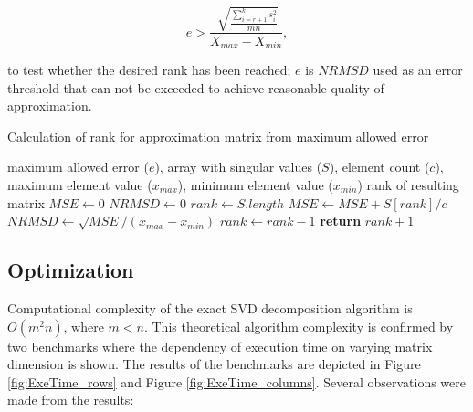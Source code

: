 \begin{equation}
e > \frac{\sqrt[]{\frac{\sum_{i=r+1}^{k} s_{i}^{2}}{m n}}}{X_{max}-X_{min}},
\end{equation}

\noindent
to test whether the desired rank has been reached; $e$ is $\mathit{NRMSD}$ used as an error threshold that can not be exceeded to achieve reasonable quality of approximation.

\begin{algorithm}
  \caption{Calculation of rank for approximation matrix from maximum allowed error}\label{rankAlgorithm}
  \label{alg:rank-calculation}
  \begin{algorithmic}[1]
  	\INPUT maximum allowed error ($e$), array with singular values ($S$), element count ($c$), maximum element value ($x_{max}$), minimum element value ($x_{min}$)
    \OUTPUT rank of resulting matrix
      \State $\mathit{MSE} \gets 0$
      \State $\mathit{NRMSD} \gets 0$
      \State $rank \gets S.length$
        \State $\mathit{MSE} \gets \mathit{MSE} + S[rank]/c$ 
        \State $\mathit{NRMSD} \gets \sqrt{\mathit{MSE}} / (x_{max} - x_{min})$ 
        \State $rank \gets rank - 1$ 
      \EndWhile
      \State \textbf{return} $rank + 1$ 
    \EndProcedure
  \end{algorithmic}
\end{algorithm}

\subsection{Optimization}


Computational complexity of the exact SVD decomposition algorithm is $O(m^2n)$, where $m<n$. This theoretical algorithm complexity is confirmed by two benchmarks where the dependency of execution time on varying matrix dimension is shown. The results of the benchmarks are depicted in Figure \ref{fig:ExeTime_rows} and Figure \ref{fig:ExeTime_columns}. Several observations were made from the results:

